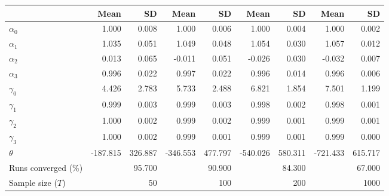 
\begin{tabular}[t]{lrrrrrrrr}
\toprule
  & Mean & SD & Mean  & SD  & Mean   & SD   & Mean    & SD   \\
\midrule
$\alpha_{0}$ & 1.000 & 0.008 & 1.000 & 0.006 & 1.000 & 0.004 & 1.000 & 0.002\\
$\alpha_{1}$ & 1.035 & 0.051 & 1.049 & 0.048 & 1.054 & 0.030 & 1.057 & 0.012\\
$\alpha_{2}$ & 0.013 & 0.065 & -0.011 & 0.051 & -0.026 & 0.030 & -0.032 & 0.007\\
$\alpha_{3}$ & 0.996 & 0.022 & 0.997 & 0.022 & 0.996 & 0.014 & 0.996 & 0.006\\
$\gamma_{0}$ & 4.426 & 2.783 & 5.733 & 2.488 & 6.821 & 1.854 & 7.501 & 1.199\\
$\gamma_{1}$ & 0.999 & 0.003 & 0.999 & 0.003 & 0.998 & 0.002 & 0.998 & 0.001\\
$\gamma_{2}$ & 1.000 & 0.002 & 0.999 & 0.002 & 0.999 & 0.001 & 0.999 & 0.001\\
$\gamma_{3}$ & 1.000 & 0.002 & 0.999 & 0.001 & 0.999 & 0.001 & 0.999 & 0.000\\
$\theta$ & -187.815 & 326.887 & -346.553 & 477.797 & -540.026 & 580.311 & -721.433 & 615.717\\
Runs converged (\%) &  & 95.700 &  & 90.900 &  & 84.300 &  & 67.000\\
Sample size ($T$) &  & 50 &  & 100 &  & 200 &  & 1000\\
\bottomrule
\end{tabular}
